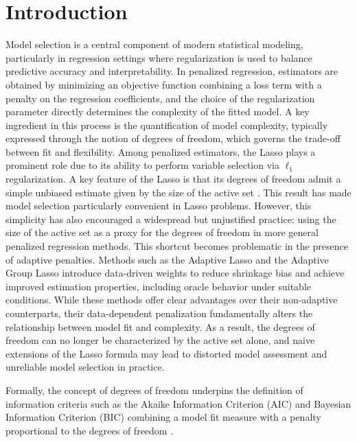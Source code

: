 \documentclass[a4paper, 12pt]{article}
\begin{document}
\section{Introduction}
\label{sec:mod}
%
Model selection is a central component of modern statistical modeling, particularly in regression settings where regularization is used to balance predictive accuracy and interpretability. In penalized regression, estimators are obtained by minimizing an objective function combining a loss term with a penalty on the regression coefficients, and the choice of the regularization parameter directly determines the complexity of the fitted model. A key ingredient in this process is the quantification of model complexity, typically expressed through the notion of degrees of freedom, which governs the trade-off between fit and flexibility. Among penalized estimators, the Lasso \citep{tibshirani1996} plays a prominent role due to its ability to perform variable selection via $\ell_1$ regularization. A key feature of the Lasso is that its degrees of freedom admit a simple unbiased estimate given by the size of the active set \citep{zou2007}. This result has made model selection particularly convenient in Lasso problems. However, this simplicity has also encouraged a widespread but unjustified practice: using the size of the active set as a proxy for the degrees of freedom in more general penalized regression methods. This shortcut becomes problematic in the presence of adaptive penalties. Methods such as the Adaptive Lasso \citep{zou.2006} and the Adaptive Group Lasso \citep{wangleng2008csda} introduce data-driven weights to reduce shrinkage bias and achieve improved estimation properties, including oracle behavior under suitable conditions. While these methods offer clear advantages over their non-adaptive counterparts, their data-dependent penalization fundamentally alters the relationship between model fit and complexity. As a result, the degrees of freedom can no longer be characterized by the active set alone, and naive extensions of the Lasso formula may lead to distorted model assessment and unreliable model selection in practice.\par
%
Formally, the concept of degrees of freedom underpins the definition of information criteria such as the Akaike Information Criterion (AIC) and Bayesian Information Criterion (BIC) combining a model fit measure with a penalty proportional to the degrees of freedom \citep{safken_etal.2025bmtrk}. %
\end{document}
